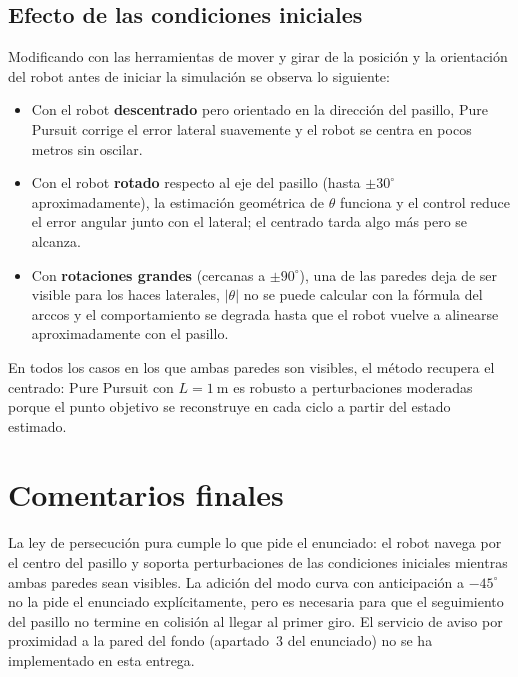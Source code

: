 \subsection{Efecto de las condiciones iniciales}
Modificando con las herramientas de mover y girar de \coppelia{} la posici\'{o}n y la orientaci\'{o}n del robot antes de iniciar la simulaci\'{o}n se observa lo siguiente:
\begin{itemize}[leftmargin=2em]
  \item Con el robot \textbf{descentrado} pero orientado en la direcci\'{o}n del pasillo, Pure Pursuit corrige el error lateral suavemente y el robot se centra en pocos metros sin oscilar.
  \item Con el robot \textbf{rotado} respecto al eje del pasillo (hasta $\pm 30^\circ$ aproximadamente), la estimaci\'{o}n geom\'{e}trica de $\theta$ funciona y el control reduce el error angular junto con el lateral; el centrado tarda algo m\'{a}s pero se alcanza.
  \item Con \textbf{rotaciones grandes} (cercanas a $\pm 90^\circ$), una de las paredes deja de ser visible para los haces laterales, $|\theta|$ no se puede calcular con la f\'{o}rmula del arccos y el comportamiento se degrada hasta que el robot vuelve a alinearse aproximadamente con el pasillo.
\end{itemize}

En todos los casos en los que ambas paredes son visibles, el m\'{e}todo recupera el centrado: Pure Pursuit con $L = \SI{1}{\meter}$ es robusto a perturbaciones moderadas porque el punto objetivo se reconstruye en cada ciclo a partir del estado estimado.


\section{Comentarios finales}

La ley de persecuci\'{o}n pura cumple lo que pide el enunciado: el robot navega por el centro del pasillo y soporta perturbaciones de las condiciones iniciales mientras ambas paredes sean visibles. La adici\'{o}n del modo curva con anticipaci\'{o}n a $-45^\circ$ no la pide el enunciado expl\'{i}citamente, pero es necesaria para que el seguimiento del pasillo no termine en colisi\'{o}n al llegar al primer giro. El servicio de aviso por proximidad a la pared del fondo (apartado~3 del enunciado) no se ha implementado en esta entrega.
